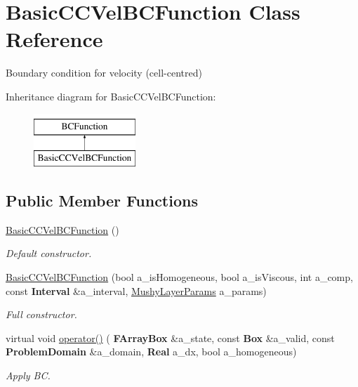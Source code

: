 \hypertarget{class_basic_c_c_vel_b_c_function}{}\section{Basic\+C\+C\+Vel\+B\+C\+Function Class Reference}
\label{class_basic_c_c_vel_b_c_function}


Boundary condition for velocity (cell-\/centred)  


Inheritance diagram for Basic\+C\+C\+Vel\+B\+C\+Function\+:\begin{figure}[H]
\begin{center}
\leavevmode
\includegraphics[height=2.000000cm]{class_basic_c_c_vel_b_c_function}
\end{center}
\end{figure}
\subsection*{Public Member Functions}
\begin{DoxyCompactItemize}
\item 
\mbox{\label{class_basic_c_c_vel_b_c_function_a2aefce6b0178a7685f7e9a8870e06469}} 
\hyperlink{class_basic_c_c_vel_b_c_function_a2aefce6b0178a7685f7e9a8870e06469}{Basic\+C\+C\+Vel\+B\+C\+Function} ()
\begin{DoxyCompactList}\small\item\em Default constructor. \end{DoxyCompactList}\item 
\mbox{\label{class_basic_c_c_vel_b_c_function_a711e57cd3a83086f95464007d155f8af}} 
\hyperlink{class_basic_c_c_vel_b_c_function_a711e57cd3a83086f95464007d155f8af}{Basic\+C\+C\+Vel\+B\+C\+Function} (bool a\+\_\+is\+Homogeneous, bool a\+\_\+is\+Viscous, int a\+\_\+comp, const \textbf{ Interval} \&a\+\_\+interval, \hyperlink{class_mushy_layer_params}{Mushy\+Layer\+Params} a\+\_\+params)
\begin{DoxyCompactList}\small\item\em Full constructor. \end{DoxyCompactList}\item 
\mbox{\label{class_basic_c_c_vel_b_c_function_aaa772ec6372e133171a66d8d778a3cb7}} 
virtual void \hyperlink{class_basic_c_c_vel_b_c_function_aaa772ec6372e133171a66d8d778a3cb7}{operator()} (\textbf{ F\+Array\+Box} \&a\+\_\+state, const \textbf{ Box} \&a\+\_\+valid, const \textbf{ Problem\+Domain} \&a\+\_\+domain, \textbf{ Real} a\+\_\+dx, bool a\+\_\+homogeneous)
\begin{DoxyCompactList}\small\item\em Apply BC. \end{DoxyCompactList}\end{DoxyCompactItemize}
